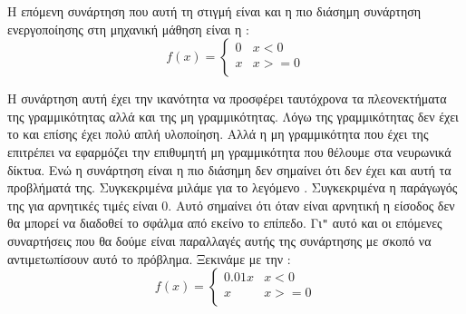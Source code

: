Η επόμενη συνάρτηση που αυτή τη στιγμή είναι και η πιο διάσημη συνάρτηση ενεργοποίησης στη μηχανική μάθηση είναι η :
\[f(x)=\left\{\begin{array}{ll}0 & x<0 \\ x & x>=0 \\ \end{array} \right.\]
\begin{figure}[H]
    \centering
    \caption{}
\end{figure}
Η συνάρτηση αυτή έχει την ικανότητα να προσφέρει ταυτόχρονα τα πλεονεκτήματα της γραμμικότητας αλλά και της μη γραμμικότητας. Λόγω της γραμμικότητας δεν έχει το  και επίσης έχει πολύ απλή υλοποίηση. Αλλά η μη
γραμμικότητα που έχει της επιτρέπει να εφαρμόζει την επιθυμητή μη γραμμικότητα που θέλουμε στα νευρωνικά δίκτυα. Ενώ η συνάρτηση είναι η πιο διάσημη δεν σημαίνει ότι δεν έχει και αυτή τα προβλήματά της. Συγκεκριμένα μιλάμε για το λεγόμενο
. Συγκεκριμένα η παράγωγός της για αρνητικές τιμές είναι 0. Αυτό σημαίνει ότι όταν είναι αρνητική η είσοδος δεν θα μπορεί να διαδοθεί το σφάλμα από εκείνο το επίπεδο. Γι\texttt{"} αυτό και οι επόμενες συναρτήσεις που θα δούμε
είναι παραλλαγές αυτής της συνάρτησης με σκοπό να αντιμετωπίσουν αυτό το πρόβλημα. Ξεκινάμε με την :
\[f(x)=\left\{\begin{array}{ll}0.01x & x<0 \\ x & x>=0 \\ \end{array} \right.\]
\begin{figure}[H]
    \centering
    \caption{}
\end{figure}

